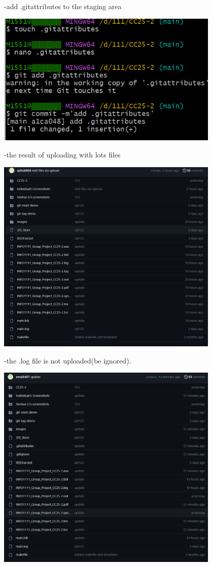 \documentclass[a4paper, 11pt]{report}
\begin{document}
-add .gitattributes to the staging area
\begin{center}
	\includegraphics[width=0.8\textwidth, keepaspectratio]{attributes.png}
\end{center}
-the result of uploading with lots files
\begin{center}
	\includegraphics[width=0.8\textwidth, keepaspectratio]{complete2.png}
\end{center}
-the .log file is not uploaded(be ignored).
\begin{center}
	\includegraphics[width=0.8\textwidth, keepaspectratio]{complete1.png}
\end{center}
\end{document}
